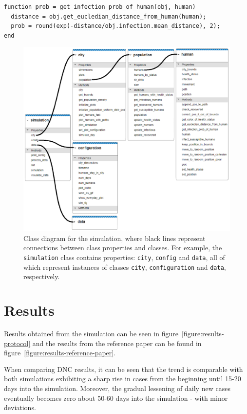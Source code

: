 \documentclass[a4paper]{article}
\newcommand{\code}{\texttt}
\begin{document}
\begin{lstlisting}[caption={Function for getting the probability of infection between an infectious human and a susceptible human, where \code{obj} is \code{human} - specifically, an instance of \code{human} whose health status is infectious.}, captionpos=b, label={code:get-infection-prob-of-human}]
function prob = get_infection_prob_of_human(obj, human)		
  distance = obj.get_eucledian_distance_from_human(human);
  prob = round(exp(-distance/obj.infection.mean_distance), 2);
end
\end{lstlisting}

\begin{figure}[h!]
	\centering
	\includegraphics[scale=0.65]{images/simulation_class_diagram.png}
	\caption{Class diagram for the simulation, where black lines represent connections between class properties and classes. For example, the \code{simulation} class contains properties: \code{city}, \code{config} and \code{data}, all of which represent instances of classes \code{city}, \code{configuration} and \code{data}, respectively.}
	\label{figure:simulation-class-diagram}
\end{figure}




\section{Results}\label{section:results}
Results obtained from the simulation can be seen in figure~\ref{figure:results-protocol} and the results from the reference paper \cite{Maltezos2021} can be found in figure~\ref{figure:results-reference-paper}.
\par
When comparing DNC results, it can be seen that the trend is comparable with both simulations exhibiting a sharp rise in cases from the beginning until 15-20 days into the simulation. Moreover, the gradual lessening of daily new cases eventually becomes zero about 50-60 days into the simulation - with minor deviations.
\end{document}
